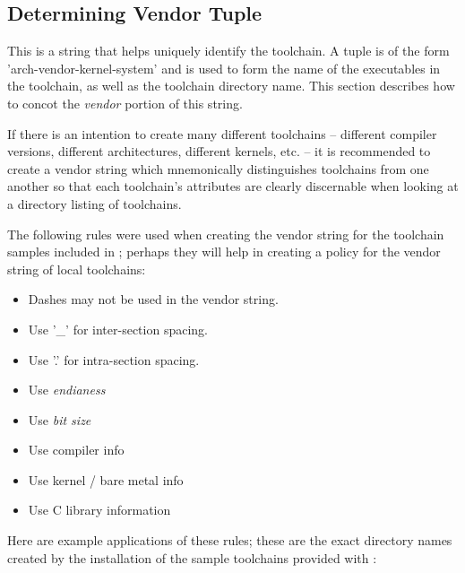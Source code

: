 \subsection{Determining Vendor Tuple}\label{toolchain-config:vendor-string}

This is a string that helps uniquely identify the toolchain.  A tuple
is of the form 'arch-vendor-kernel-system' and is used to form the
name of the executables in the toolchain, as well as the toolchain
directory name.  This section describes how to concot the
\emph{vendor} portion of this string.

If there is an intention to create many different toolchains --
different compiler versions, different architectures, different
kernels, etc. -- it is recommended to create a vendor string which
mnemonically distinguishes toolchains from one another so that each
toolchain's attributes are clearly discernable when looking at a
directory listing of toolchains.

The following rules were used when creating the vendor string for the
toolchain samples included in \lmsbw; perhaps they will help in
creating a policy for the vendor string of local toolchains:

\begin{itemize}
\item{Dashes may not be used in the vendor string.}
\item{Use '\_' for inter-section spacing.}
\item{Use '.' for intra-section spacing.}
\item{Use \emph{endianess}}
\item{Use \emph{bit size}}
\item{Use compiler info}
\item{Use kernel / bare metal info}
\item{Use C library information}
\end{itemize}

Here are example applications of these rules; these are the exact
directory names created by the installation of the sample toolchains
provided with \lmsbw:


